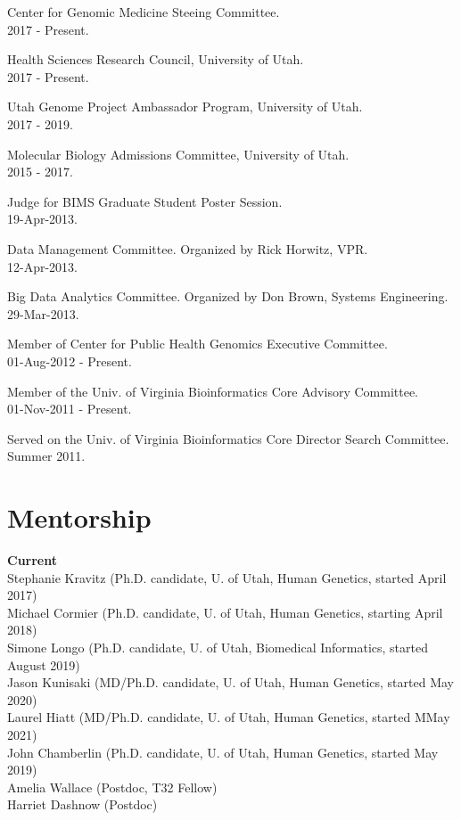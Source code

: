 \documentclass[margin,line]{cv}
\begin{document}
\begin{resume}
    Center for Genomic Medicine Steeing Committee. \\
    2017 - Present.

    Health Sciences Research Council, University of Utah. \\
    2017 - Present.

    Utah Genome Project Ambassador Program, University of Utah. \\
    2017 - 2019.

    Molecular Biology Admissions Committee, University of Utah. \\
    2015 - 2017.

    Judge for BIMS Graduate Student Poster Session. \\
    19-Apr-2013.

    Data Management Committee. Organized by Rick Horwitz, VPR.\\
    12-Apr-2013.

    Big Data Analytics Committee. Organized by Don Brown, Systems Engineering.\\
    29-Mar-2013.

    Member of Center for Public Health Genomics Executive Committee.\\
    01-Aug-2012 - Present.

    \vspace{-2mm}
    Member of the Univ. of Virginia Bioinformatics Core Advisory Committee.\\
    01-Nov-2011 - Present.

    \vspace{-2mm}
    Served on the Univ. of Virginia Bioinformatics Core Director Search Committee. \\
    Summer 2011.



    \section{\mysidestyle Mentorship}
    \textbf{Current} \\
    Stephanie Kravitz (Ph.D. candidate, U. of Utah, Human Genetics, started April 2017) \\
    Michael Cormier (Ph.D. candidate, U. of Utah, Human Genetics, starting April 2018) \\
    Simone Longo (Ph.D. candidate, U. of Utah, Biomedical Informatics, started August 2019) \\
    Jason Kunisaki  (MD/Ph.D. candidate, U. of Utah, Human Genetics, started May 2020) \\
    Laurel Hiatt  (MD/Ph.D. candidate, U. of Utah, Human Genetics, started MMay 2021) \\
    John Chamberlin  (Ph.D. candidate, U. of Utah, Human Genetics, started May 2019) \\
    Amelia Wallace (Postdoc, T32 Fellow) \\
    Harriet Dashnow (Postdoc) \\



\end{resume}
\end{document}
